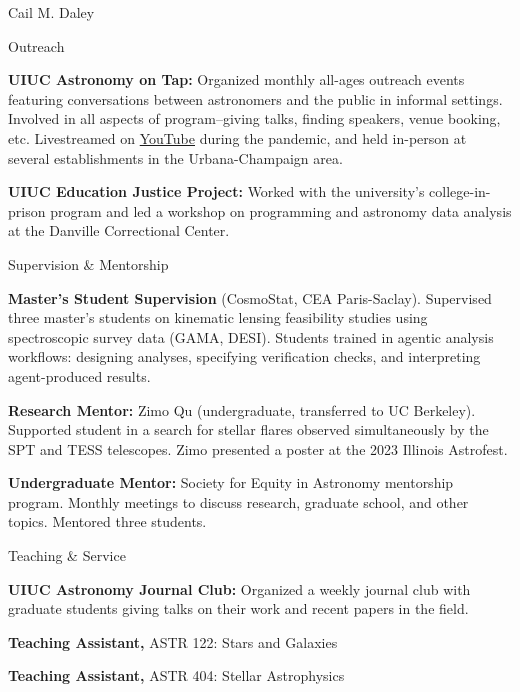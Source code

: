 \documentclass[11pt,a4paper]{article}
\begin{document}
\begin{cv}{Cail M. Daley}
\begin{cvlist}{Outreach}
  \item[2020-2022] \textbf{UIUC Astronomy on Tap:} Organized monthly all-ages outreach events featuring conversations between astronomers and the public in informal settings. Involved in all aspects of program--giving talks, finding speakers, venue booking, etc. Livestreamed on \href{https://www.youtube.com/@astroontapcu219/streams}{YouTube} during the pandemic, and held in-person at several establishments in the Urbana-Champaign area.
  \item[2019] \textbf{UIUC Education Justice Project:} Worked with the university's college-in-prison program and led a workshop on programming and astronomy data analysis at the Danville Correctional Center.
  \end{cvlist}

  \begin{cvlist}{Supervision \& Mentorship}
  \item[2024--2025] \textbf{Master's Student Supervision} (CosmoStat, CEA Paris-Saclay). Supervised three master's students on kinematic lensing feasibility studies using spectroscopic survey data (GAMA, DESI). Students trained in agentic analysis workflows: designing analyses, specifying verification checks, and interpreting agent-produced results.

  \item[2022--2023] \textbf{Research Mentor:} Zimo Qu (undergraduate, transferred to UC Berkeley). Supported student in a search for stellar flares observed simultaneously by the SPT and TESS telescopes. Zimo presented a poster at the 2023 Illinois Astrofest.

  \item[2020--2021] \textbf{Undergraduate Mentor:} Society for Equity in Astronomy mentorship program. Monthly meetings to discuss research, graduate school, and other topics. Mentored three students.
  \end{cvlist}

  \begin{cvlist}{Teaching \& Service}
  \item[2021-2022] \textbf{UIUC Astronomy Journal Club:} Organized a weekly journal club with graduate students giving talks on their work and recent papers in the field.

  \item[2019] \textbf{Teaching Assistant,} ASTR 122: Stars and Galaxies

  \item[2018] \textbf{Teaching Assistant,} ASTR 404: Stellar Astrophysics
  \end{cvlist}


\end{cv}
\end{document}
